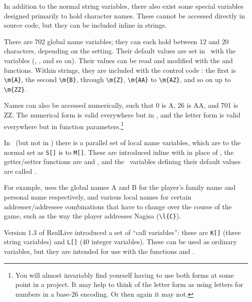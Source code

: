       In addition to the normal string variables, there also exist some special
      variables designed primarily to hold character names.  These cannot be
      accessed directly in source code, but they can be included inline in
      strings.

      There are 702 global name variables; they can each hold between 12 and 20
      characters, depending on the  setting. 
      Their default values are set in \gameexe\ with the  
      variables (, , and so on).  Their values can 
      be read and modified with the  and  
      functions. Within strings, they are included with the control code 
      : the first is \lstinline|\m{A}|, the second \lstinline|\m{B}|, 
      through \lstinline|\m{Z}|, \lstinline|\m{AA}| to \lstinline|\m{AZ}|, and 
      so on up to \lstinline|\m{ZZ}|.

      Names can also be accessed numerically, such that 0 is A, 26 is AA, and 
      701 is ZZ.  The numerical form is valid everywhere but in \gameexe, and 
      the letter form is valid everywhere but in function 
      parameters.\footnote{You will almost invariably find yourself having to 
      use both forms at some point in a project. It may help to think of the 
      letter form as using letters for numbers in a base-26 encoding. Or then 
      again it may not.}
      
      In \reallive\ (but not in \avgns) there is a parallel set of local name 
      variables, which are to the normal set as \lstinline|S[]| is to 
      \lstinline|M[]|. These are introduced inline with  in place of 
      , the getter/setter functions are  and 
      , and the \gameexe\ variables defining their default
      values are called .

      For example,  uses the global names A and B for the player's
      family name and personal name respectively, and various local names for
      certain addresser/addressee combinations that have to change over the
      course of the game, such as the way the player addresses Nagisa
      (\lstinline|\l{C}|).

  \label{sec:callvars}
  
    Version 1.3 of RealLive introduced a set of ``call variables'': these are 
    \lstinline|K[]| (three string variables) and \lstinline|L[]| (40 integer 
    variables).  These can be used as ordinary variables, but they are intended 
    for use with the functions  and 
    .
    
